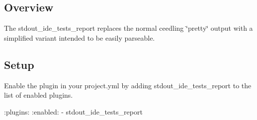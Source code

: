 \subsection*{Overview}

The stdout\+\_\+ide\+\_\+tests\+\_\+report replaces the normal ceedling \char`\"{}pretty\char`\"{} output with a simplified variant intended to be easily parseable.

\subsection*{Setup}

Enable the plugin in your project.\+yml by adding {\ttfamily stdout\+\_\+ide\+\_\+tests\+\_\+report} to the list of enabled plugins.


\begin{DoxyCode}
:plugins:
  :enabled:
    - stdout\_ide\_tests\_report
\end{DoxyCode}
 